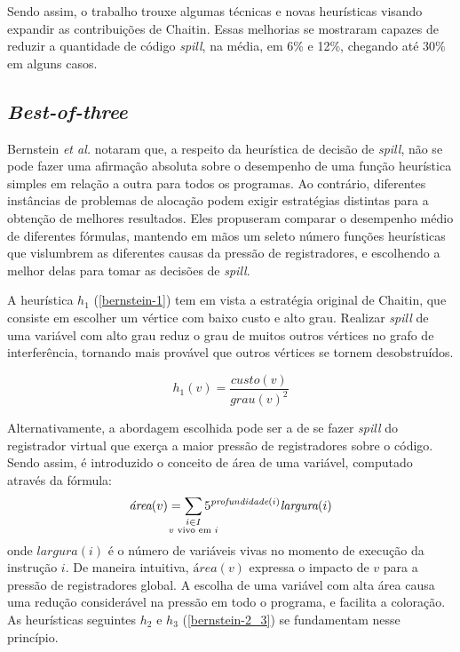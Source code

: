 \documentclass[
	12pt,				%
	openright,			%
	oneside,			%
	a4paper,			%
	tccpreliminar,			%
	]{ABNT-DC-UEL}
\begin{document}
Sendo assim, o trabalho trouxe algumas técnicas e novas heurísticas visando expandir as contribuições de Chaitin. Essas melhorias se mostraram capazes de reduzir a quantidade de código \textit{spill}, na média, em 6\% e 12\%, chegando até 30\% em alguns casos.

\subsection{\textit{Best-of-three}}

Bernstein \textit{et al.} notaram que, a respeito da heurística de decisão de \textit{spill}, não se pode fazer uma afirmação absoluta sobre o desempenho de uma função heurística simples em relação a outra para todos os programas. Ao contrário, diferentes instâncias de problemas de alocação podem exigir estratégias distintas para a obtenção de melhores resultados. Eles propuseram comparar o desempenho médio de diferentes fórmulas, mantendo em mãos um seleto número funções heurísticas que vislumbrem as diferentes causas da pressão de registradores, e escolhendo a melhor delas para tomar as decisões de \textit{spill}.

A heurística $h_1$ (\ref{bernstein-1}) tem em vista a estratégia original de Chaitin, que consiste em escolher um vértice com baixo custo e alto grau. Realizar \textit{spill} de uma variável com alto grau reduz o grau de muitos outros vértices no grafo de interferência, tornando mais provável que outros vértices se tornem desobstruídos.

\begin{equation}
    h_1(v) = \frac{\textit{custo}(v)}{\textit{grau}(v)^2}
    \label{bernstein-1}
\end{equation}

Alternativamente, a abordagem escolhida pode ser a de se fazer \textit{spill} do registrador virtual que exerça a maior pressão de registradores sobre o código. Sendo assim, é introduzido o conceito de área de uma variável, computado através da fórmula:
\begin{equation}
    \textit{área}(v) = \sum_{\mathclap{\substack{i \in I\\v\text{ vivo em }i}}} 5 ^ {\textit{profundidade}(i)} \textit{largura}(i)
    \label{bernstein-area}
\end{equation}
onde $\textit{largura}(i)$ é o número de variáveis vivas no momento de execução da instrução $i$. De maneira intuitiva, $\textit{área}(v)$ expressa o impacto de $v$ para a pressão de registradores global. A escolha de uma variável com alta área causa uma redução considerável na pressão em todo o programa, e facilita a coloração. As heurísticas seguintes $h_2$ e $h_3$ (\ref{bernstein-2_3}) se fundamentam nesse princípio.
\end{document}

